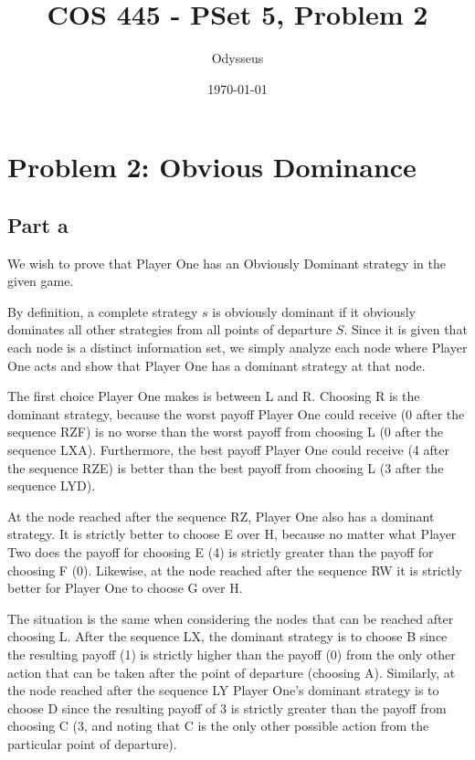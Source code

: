\documentclass[12pt]{article}%
\begin{document}
\title{COS 445 - PSet 5, Problem 2} %
\author{Odysseus} %
\date{\today}
\maketitle
\section*{Problem 2: Obvious Dominance}
\subsection*{Part a}
We wish to prove that Player One has an Obviously Dominant strategy in the given game.

By definition, a complete strategy $s$ is obviously dominant if it obviously dominates all other strategies from all points of departure $S$. Since it is given that each node is a distinct information set, we simply analyze each node where Player One acts and show that Player One has a dominant strategy at that node.

The first choice Player One makes is between L and R. Choosing R is the dominant strategy, because the worst payoff Player One could receive (0 after the sequence RZF) is no worse than the worst payoff from choosing L (0 after the sequence LXA). Furthermore, the best payoff Player One could receive (4 after the sequence RZE) is better than the best payoff from choosing L (3 after the sequence LYD).

At the node reached after the sequence RZ, Player One also has a dominant strategy. It is strictly better to choose E over H, because no matter what Player Two does the payoff for choosing E (4) is strictly greater than the payoff for choosing F (0). Likewise, at the node reached after the sequence RW it is strictly better for Player One to choose G over H.

The situation is the same when considering the nodes that can be reached after choosing L. After the sequence LX, the dominant strategy is to choose B since the resulting payoff (1) is strictly higher than the payoff (0) from the only other action that can be taken after the point of departure (choosing A). Similarly, at the node reached after the sequence LY Player One's dominant strategy is to choose D since the resulting payoff of 3 is strictly greater than the payoff from choosing C (3, and noting that C is the only other possible action from the particular point of departure).
\end{document}
